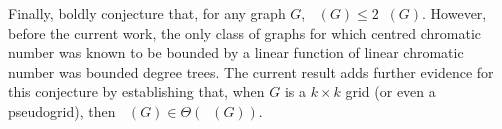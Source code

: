 \documentclass{patmorin}
\DeclareMathOperator{\tw}{tw}
\DeclareMathOperator{\td}{td}
\DeclareMathOperator{\chicen}{\chi_{\mathrm{cen}}}
\DeclareMathOperator{\chilin}{\chi_{\mathrm{lin}}}
\begin{document}
Finally, \citet{kun.obrien.ea:polynomial} boldly conjecture that, for any graph $G$, $\chicen(G)\le 2\chilin(G)$.  However, before the current work, the only class of graphs for which centred chromatic number was known to be bounded by a linear function of linear chromatic number was bounded degree trees.  The current result adds further evidence for this conjecture by establishing that, when $G$ is a $k\times k$ grid (or even a pseudogrid), then $\chicen(G)\in\Theta(\chilin(G))$.
% 
% 




% 
\end{document}
